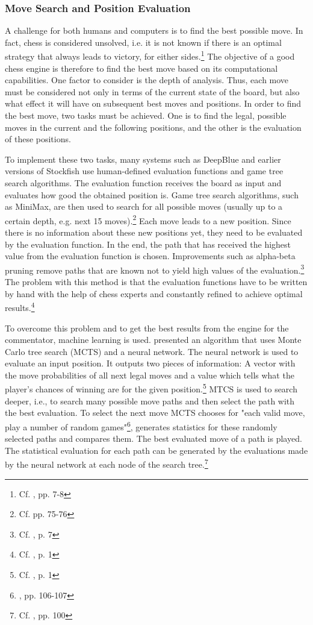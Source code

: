 \subsubsection{Move Search and Position Evaluation}

A challenge for both humans and computers is to find the best possible move. In fact, chess is considered unsolved, i.e. it is not known if there is an optimal strategy that always leads to victory, for either sides.\footnote{Cf. \cite{allis-1994-solving}, pp. 7-8} The objective of a good chess engine is therefore to find the best move based on its computational capabilities. One factor to consider is the depth of analysis. Thus, each move must be considered not only in terms of the current state of the board, but also what effect it will have on subsequent best moves and positions. In order to find the best move, two tasks must be achieved. One is to find the legal, possible moves in the current and the following positions, and the other is the evaluation of these positions.

To implement these two tasks, many systems such as \Gls{DeepBlue} and earlier versions of \Gls{Stockfish} use human-defined evaluation functions and game tree search algorithms. The evaluation function receives the board as input and evaluates how good the obtained position is. Game tree search algorithms, such as MiniMax, are then used to search for all possible moves (usually up to a certain depth, e.g. next 15 moves).\footnote{Cf. \cite{nnfc-2022} pp. 75-76} Each move leads to a new position. Since there is no information about these new positions yet, they need to be evaluated by the evaluation function. In the end, the path that has received the highest value from the evaluation function is chosen. Improvements such as alpha-beta pruning remove paths that are known not to yield high values of the evaluation.\footnote{Cf. \cite{keen-2009-history}, p. 7} The problem with this method is that the evaluation functions have to be written by hand with the help of chess experts and constantly refined to achieve optimal results.\footnote{Cf. \cite{alphazero-2018}, p. 1}

To overcome this problem and to get the best results from the engine for the commentator, machine learning is used. \cite{alphazero-2018} presented an algorithm that uses Monte Carlo tree search (MCTS) and a neural network. The neural network is used to evaluate an input position. It outputs two pieces of information: A vector with the move probabilities of all next legal moves and a value which tells what the player's chances of winning are for the given position.\footnote{Cf. \cite{alphazero-2018}, p. 1} MTCS is used to search deeper, i.e., to search many possible move paths and then select the path with the best evaluation. To select the next move MCTS chooses for "each valid move, play a number of random games"\footnote{\cite{nnfc-2022}, pp. 106-107}, generates statistics for these randomly selected paths and compares them. The best evaluated move of a path is played. The statistical evaluation for each path can be generated by the evaluations made by the neural network at each node of the search tree.\footnote{Cf. \cite{nnfc-2022}, pp. 100}

